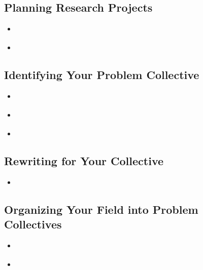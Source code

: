 \documentclass[11pt]{article}
\begin{document}
\subsection{Planning Research Projects}
\begin{itemize}
\item \begin{exercise}
\end{exercise}

\vspace{20pt}
\item \begin{exercise}
\end{exercise}
\end{itemize}
\subsection{Identifying Your Problem Collective}
\begin{itemize}
\item  \begin{exercise}
\end{exercise}

\vspace{20pt}
\item  \begin{exercise}
\end{exercise}

\vspace{20pt}
\item  \begin{exercise}
\end{exercise}
\end{itemize}
\subsection{Rewriting for Your Collective}
\begin{itemize}
\item \begin{exercise}
\end{exercise}
\end{itemize}
\subsection{Organizing Your Field into Problem Collectives}
\begin{itemize}
\item \begin{exercise}
\end{exercise}

\vspace{20pt}
\item  \begin{exercise}
\end{exercise} 
\end{itemize}
\end{document}
